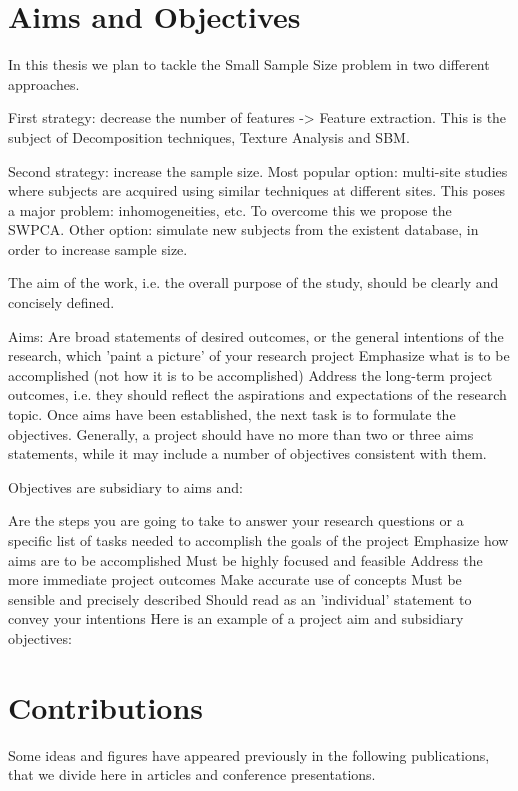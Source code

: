 
\section{Aims and Objectives}\label{sec:overview}
In this thesis we plan to tackle the Small Sample Size problem in two different approaches. 


First strategy: decrease the number of features -> Feature extraction. This is the subject of Decomposition techniques, Texture Analysis and \ac{SBM}. 

Second strategy: increase the sample size. Most popular option: multi-site studies where subjects are acquired using similar techniques at different sites. This poses a major problem: inhomogeneities, etc. To overcome this we propose the \ac{SWPCA}. Other option: simulate new subjects from the existent database, in order to increase sample size.



The aim of the work, i.e. the overall purpose of the study, should be clearly and concisely defined.

Aims:
Are broad statements of desired outcomes, or the general intentions of the research, which 'paint a picture' of your research project
Emphasize what is to be accomplished (not how it is to be accomplished)
Address the long-term project outcomes, i.e. they should reflect the aspirations and expectations of the research topic.
Once aims have been established, the next task is to formulate the objectives. Generally, a project should have no more than two or three aims statements, while it may include a number of objectives consistent with them.

Objectives are subsidiary to aims and:

Are the steps you are going to take to answer your research questions or a specific list of tasks needed to accomplish the goals of the project
Emphasize how aims are to be accomplished
Must be highly focused and feasible
Address the more immediate project outcomes
Make accurate use of concepts
Must be sensible and precisely described
Should read as an 'individual' statement to convey your intentions
Here is an example of a project aim and subsidiary objectives:



\section{Contributions}
Some ideas and figures have appeared previously in the following publications, that we divide here in articles and conference presentations. 

